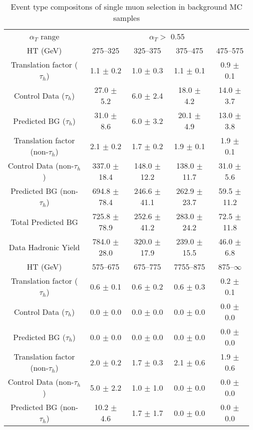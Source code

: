 \documentclass[a4paper,12pt]{article}
\begin{document}
 
\begin{table}[htl] 
\caption{Event type compositons of single muon selection in background MC samples}
 \begin{flushleft}
 \begin{tabular}{ c|cccc }
\hline
$ \alpha_T $ range   &  \multicolumn{4}{c}{$\alpha_T > $ 0.55}\\ 
  HT (GeV) & 275--325 & 325--375 & 375--475 & 475--575 \\ 
 Translation factor ($\tau_h$) & 1.1 $\pm$ 0.2  & 1.0 $\pm$ 0.3  & 1.1 $\pm$ 0.1  & 0.9 $\pm$ 0.1 \\ 
Control Data ($\tau_h$) & 27.0 $\pm$ 5.2  & 6.0 $\pm$ 2.4  & 18.0 $\pm$ 4.2  & 14.0 $\pm$ 3.7 \\ 
Predicted BG ($\tau_h$) & 31.0 $\pm$ 8.6  & 6.0 $\pm$ 3.2  & 20.1 $\pm$ 4.9  & 13.0 $\pm$ 3.8 \\ 
\hline
Translation factor (non-$\tau_h$) & 2.1 $\pm$ 0.2  & 1.7 $\pm$ 0.2  & 1.9 $\pm$ 0.1  & 1.9 $\pm$ 0.1 \\ 
Control Data (non-$\tau_h$) & 337.0 $\pm$ 18.4  & 148.0 $\pm$ 12.2  & 138.0 $\pm$ 11.7  & 31.0 $\pm$ 5.6 \\ 
Predicted BG (non-$\tau_h$) & 694.8 $\pm$ 78.4  & 246.6 $\pm$ 41.1  & 262.9 $\pm$ 23.7  & 59.5 $\pm$ 11.2 \\ 
\hline
Total Predicted BG & 725.8 $\pm$ 78.9  & 252.6 $\pm$ 41.2  & 283.0 $\pm$ 24.2  & 72.5 $\pm$ 11.8 \\ 
Data Hadronic Yield & 784.0 $\pm$ 28.0  & 320.0 $\pm$ 17.9  & 239.0 $\pm$ 15.5  & 46.0 $\pm$ 6.8 \\ 
\hline
 HT (GeV) & 575--675 & 675--775 & 7755--875 & 875--$\infty$ \\ 
 Translation factor ($\tau_h$) & 0.6 $\pm$ 0.1  & 0.6 $\pm$ 0.2  & 0.6 $\pm$ 0.3  & 0.2 $\pm$ 0.1 \\ 
Control Data ($\tau_h$) & 0.0 $\pm$ 0.0  & 0.0 $\pm$ 0.0  & 0.0 $\pm$ 0.0  & 0.0 $\pm$ 0.0 \\ 
Predicted BG ($\tau_h$) & 0.0 $\pm$ 0.0  & 0.0 $\pm$ 0.0  & 0.0 $\pm$ 0.0  & 0.0 $\pm$ 0.0 \\ 
\hline
Translation factor (non-$\tau_h$) & 2.0 $\pm$ 0.2  & 1.7 $\pm$ 0.3  & 2.1 $\pm$ 0.6  & 1.9 $\pm$ 0.6 \\ 
Control Data (non-$\tau_h$) & 5.0 $\pm$ 2.2  & 1.0 $\pm$ 1.0  & 0.0 $\pm$ 0.0  & 0.0 $\pm$ 0.0 \\ 
Predicted BG (non-$\tau_h$) & 10.2 $\pm$ 4.6  & 1.7 $\pm$ 1.7  & 0.0 $\pm$ 0.0  & 0.0 $\pm$ 0.0 \\ 
\hline

\end{tabular}
\end{flushleft}
\end{table}
\end{document}
